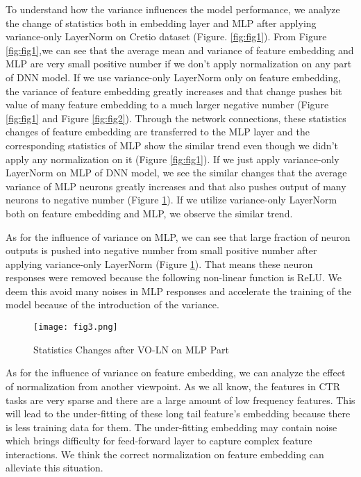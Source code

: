 \documentclass[sigconf]{acmart}
\begin{document}
To understand how the variance influences the model performance, we analyze the change of statistics both in embedding layer and MLP after applying variance-only LayerNorm on Cretio dataset (Figure. \ref{fig:fig1}).  From Figure \ref{fig:fig1},we can see that the average mean and variance of feature embedding and MLP are very small positive number if we don't apply normalization on any part of DNN model. If we use variance-only LayerNorm only on feature embedding, the variance of feature embedding greatly increases and that change pushes bit value of many feature embedding to a much larger negative number (Figure \ref{fig:fig1} and Figure \ref{fig:fig2}). Through the network connections, these statistics changes of feature embedding are transferred to the MLP layer and the corresponding statistics of MLP show the similar trend even though we didn't apply any normalization on it (Figure \ref{fig:fig1}). If we just apply variance-only LayerNorm on MLP of DNN model, we see the similar changes that the average variance of MLP neurons greatly increases and that also pushes output of many neurons to negative number (Figure \ref{fig:fig3}). If we utilize variance-only LayerNorm both on feature embedding and MLP, we observe the similar trend.


As for the influence of variance on MLP, we can see that   large fraction of neuron outputs is pushed into negative number from small positive number after applying variance-only LayerNorm (Figure \ref{fig:fig3}). That means these neuron responses were removed because the following non-linear function is ReLU. We deem this avoid many noises in MLP responses and accelerate the training of the model because of the introduction of the variance.

\begin{figure}
  \texttt{[image: fig3.png]}
  \caption{Statistics Changes after VO-LN on MLP Part}
  \label{fig:fig3}
\end{figure}

As for the influence of variance on feature embedding, we can analyze the effect of normalization from another viewpoint. As we all know, the features in CTR tasks are very sparse and there are a large amount of low frequency features. This will lead to the under-fitting of these long tail feature's embedding because there is less training data for them. The under-fitting embedding may contain noise which brings difficulty for feed-forward layer to capture complex feature interactions. We think the correct normalization on feature embedding can alleviate this situation.
\end{document}
